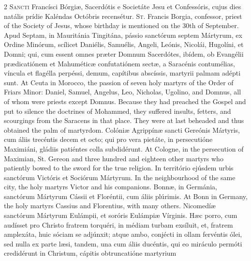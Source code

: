 \begin{paracol}{2}
\lettrine[lines=2]{S}{ancti} Francísci Bórgiæ, 
 Sacerdótis e Societáte Jesu et Confessóris, cujus dies natális prídie 
 Kaléndas Octóbris recensétur.
\switchcolumn
{}
\lettrine[lines=2]{S}{t.} Francis Borgia, confessor, 
 priest of the Society of Jesus, whose birthday is mentioned on the 30th of 
 September.
\switchcolumn*
{}
Apud Septam, in 
 Mauritánia Tingitána, pássio sanctórum septem Mártyrum, ex Ordine Minórum, 
 scílicet Daniélis, Samuélis, Angeli, Leónis, Nicolái, Hugolíni, et Domni; 
 qui, cum essent omnes præter Domnum Sacerdótes, ibídem, ob Evangélii 
 prædicatiónem et Mahuméticæ confutatiónem sectæ, a Saracénis contumélias, 
 víncula et flagélla perpéssi, demum, capítibus abscíssis, martyrii palmam 
 adépti sunt.
\switchcolumn
{}
At Ceuta in Morocco, the passion of 
 seven holy martyrs of the Order of Friars Minor: Daniel, Samuel, Angelus, 
 Leo, Nicholas, Ugolino, and Domnus, all of whom were priests except Domnus. 
 Because they had preached the Gospel and put to silence the doctrines of 
 Mohammed, they suffered insults, fetters, and scourgings from the Saracens 
 in that place. They were at last beheaded and thus obtained the palm 
 of martyrdom.
\switchcolumn*
{}
Colóniæ Agrippínæ 
 sancti Gereónis Mártyris, cum áliis trecéntis decem et octo; qui pro vera 
 pietáte, in persecutióne Maximiáni, gládiis patiéntes colla subdidérunt.
\switchcolumn
{}
At Cologne, in the persecution of 
 Maximian, St. Gereon and three hundred and eighteen other martyrs who 
 patiently bowed to the sword for the true religion.
\switchcolumn*
{}
In território ejúsdem 
 urbis sanctórum Victóris et Sociórum Mártyrum.
\switchcolumn
{}
In the neighbourhood of the same 
 city, the holy martyrs Victor and his companions.
\switchcolumn*
{}
Bonnæ, in Germánia, sanctórum Mártyrum Cássii et Floréntii, cum áliis plúrimis.
\switchcolumn
{}
At Bonn in Germany, the holy martyrs 
 Cassius and Florentius, with many others.
\switchcolumn*
{}
Nicomedíæ sanctórum 
 Mártyrum Eulámpii, et soróris Eulámpiæ Vírginis. Hæc porro, cum 
 audísset pro Christo fratrem torquéri, in médiam turbam exsíluit, et, 
 fratrem amplexáta, huic sóciam se adjúnxit; atque ambo, conjécti in ollam 
 fervéntis ólei, sed nulla ex parte læsi, tandem, una cum áliis ducéntis, qui 
 eo miráculo permóti credidérunt in Christum, cápitis obtruncatióne martyrium 

\end{paracol}
